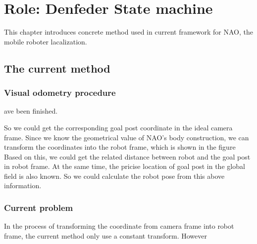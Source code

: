 \chapter{Role: Denfeder State machine}\label{Chap:StateM}
This chapter introduces concrete method used in current framework for NAO, the mobile roboter lacalization. 
\clearpage
\section{The current method}
\subsection{Visual odometry procedure}
ave been finished.


So we could get the corresponding goal post coordinate in the ideal camera frame. Since we know the geometrical value of NAO's body construction, we can transform the coordinates into the robot frame, which is shown in the figure %
Based on this, we could get the related distance between robot and the goal post in robot frame. At the same time, the pricise location of goal post in the global field is also known. So we could calculate the robot pose from this above information. %

\subsection{Current problem}
In the process of transforming the coordinate from camera frame into robot frame, the current method only use a constant transform. However
